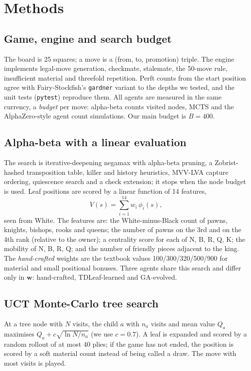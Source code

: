 \section{Methods}
\subsection{Game, engine and search budget}
The board is 25 squares; a move is a (from, to, promotion) triple. The engine implements legal-move generation, checkmate, stalemate, the 50-move rule, insufficient material and threefold repetition. Perft counts from the start position agree with Fairy-Stockfish's \texttt{gardner} variant to the depths we tested, and the unit tests (\texttt{pytest}) reproduce them. All agents are measured in the same currency, a \emph{budget} per move: alpha-beta counts visited nodes, MCTS and the AlphaZero-style agent count simulations. Our main budget is $B=400$.

\subsection{Alpha-beta with a linear evaluation}
The search is iterative-deepening negamax with alpha-beta pruning, a Zobrist-hashed \cite{zobrist1970} transposition table, killer and history heuristics, MVV-LVA capture ordering, quiescence search and a check extension; it stops when the node budget is used. Leaf positions are scored by a linear function of 14 features,
\begin{equation}
V(s)=\sum_{i=1}^{14} w_i\,\phi_i(s),
\end{equation}
seen from White. The features are: the White-minus-Black count of pawns, knights, bishops, rooks and queens; the number of pawns on the 3rd and on the 4th rank (relative to the owner); a centrality score for each of N, B, R, Q, K; the mobility of N, B, R, Q; and the number of friendly pieces adjacent to the king. The \emph{hand-crafted} weights are the textbook values 100/300/320/500/900 for material and small positional bonuses. Three agents share this search and differ only in $\mathbf{w}$: hand-crafted, TDLeaf-learned and GA-evolved.

\subsection{UCT Monte-Carlo tree search}
At a tree node with $N$ visits, the child $a$ with $n_a$ visits and mean value $Q_a$ maximises $Q_a + c\sqrt{\ln N / n_a}$ (we use $c=0.7$). A leaf is expanded and scored by a random rollout of at most 40 plies; if the game has not ended, the position is scored by a soft material count instead of being called a draw. The move with most visits is played.

